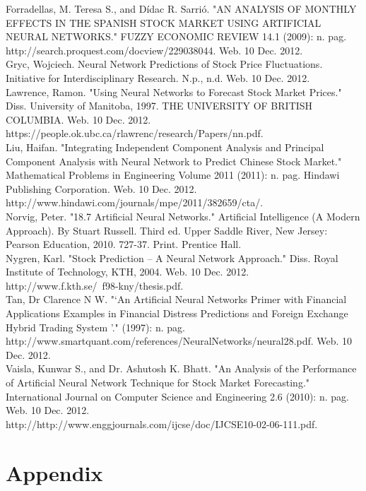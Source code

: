 \documentclass[a4paper,11pt]{article}
\begin{document}
Forradellas, M. Teresa S., and Dídac R. Sarrió. "AN ANALYSIS OF MONTHLY EFFECTS IN THE SPANISH STOCK MARKET USING ARTIFICIAL NEURAL NETWORKS." FUZZY ECONOMIC REVIEW 14.1 (2009): n. pag.\\ http://search.proquest.com/docview/229038044. Web. 10 Dec. 2012.\\

Gryc, Wojciech. Neural Network Predictions of Stock Price Fluctuations. Initiative for Interdisciplinary Research. N.p., n.d. Web. 10 Dec. 2012.\\

Lawrence, Ramon. "Using Neural Networks to Forecast Stock Market Prices." Diss. University of Manitoba, 1997. THE UNIVERSITY OF BRITISH COLUMBIA. Web. 10 Dec. 2012. https://people.ok.ubc.ca/rlawrenc/research/Papers/nn.pdf.\\

Liu, Haifan. "Integrating Independent Component Analysis and Principal Component Analysis with Neural Network to Predict Chinese Stock Market." Mathematical Problems in Engineering Volume 2011 (2011): n. pag. Hindawi Publishing Corporation. Web. 10 Dec. 2012.\\ http://www.hindawi.com/journals/mpe/2011/382659/cta/.\\

Norvig, Peter. "18.7 Artificial Neural Networks." Artificial Intelligence (A Modern Approach). By Stuart Russell. Third ed. Upper Saddle River, New Jersey: Pearson Education, 2010. 727-37. Print. Prentice Hall.\\

Nygren, Karl. "Stock Prediction – A Neural Network Approach." Diss. Royal Institute of Technology, KTH, 2004. Web. 10 Dec. 2012. http://www.f.kth.se/~f98-kny/thesis.pdf.\\

Tan, Dr Clarence N W. "‘An Artificial Neural Networks Primer with Financial Applications Examples in Financial Distress Predictions and Foreign Exchange Hybrid Trading System ’." (1997): n. pag.\\ http://www.smartquant.com/references/NeuralNetworks/neural28.pdf. Web. 10 Dec. 2012. \\

Vaisla, Kunwar S., and Dr. Ashutosh K. Bhatt. "An Analysis of the Performance of Artificial Neural Network Technique for Stock Market Forecasting." International Journal on Computer Science and Engineering 2.6 (2010): n. pag. Web. 10 Dec. 2012.\\ http://http://www.enggjournals.com/ijcse/doc/IJCSE10-02-06-111.pdf.\\

\section{Appendix}
\end{document}
